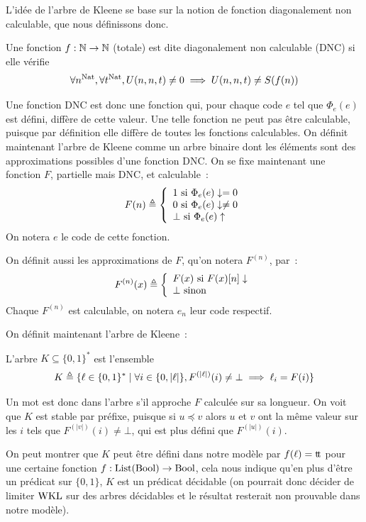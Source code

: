 \documentclass{article}
\begin{document}
L'idée de l'arbre de Kleene se base sur la notion de fonction diagonalement non calculable, que nous définissons donc.

\begin{defi}
    Une fonction $f : \mathbb{N} \to \mathbb{N}$ (totale) est dite diagonalement non calculable (DNC) si elle vérifie
    \[\forall n^{\mathrm{Nat}}, \forall t^{\mathrm{Nat}}, U(n,n,t) \neq 0 \implies U(n,n,t) \neq S(f(n))\]
\end{defi}

Une fonction DNC est donc une fonction qui, pour chaque code $e$ tel que $\Phi_e(e)$ est défini, diffère de cette valeur. Une telle fonction ne peut pas être calculable, puisque par définition elle diffère de toutes les fonctions calculables. On définit maintenant l'arbre de Kleene comme un arbre binaire dont les éléments sont des approximations possibles d'une fonction DNC. On se fixe maintenant une fonction $F$, partielle mais DNC, et calculable~:
\[F(n)\triangleq \left\{\begin{array}{l}
    1\text{ si } \Phi_e(e) \downarrow= 0\\
    0\text{ si } \Phi_e(e) \downarrow \neq 0\\
    \bot\text{ si } \Phi_e(e) \uparrow
\end{array}\right.\]
On notera $e$ le code de cette fonction.

On définit aussi les approximations de $F$, qu'on notera $F^{(n)}$, par~:
\[F^{(n)}(x) \triangleq \left\{\begin{array}{l}
    F(x) \text{ si } F(x)[n]\downarrow\\
    \bot\text{ sinon}
\end{array}\right.\]
Chaque $F^{(n)}$ est calculable, on notera $e_n$ leur code respectif.

On définit maintenant l'arbre de Kleene~:

\begin{defi}
    L'arbre $K\subseteq \{0,1\}^*$ est l'ensemble
    \[K \triangleq \{\ell \in \{0,1\}^* \mid \forall i \in \{0,|\ell|\}, F^{(|\ell|)}(i) \neq \bot \implies \ell_i = F(i)\}\]
\end{defi}

Un mot est donc dans l'arbre s'il approche $F$ calculée sur sa longueur. On voit que $K$ est stable par préfixe, puisque si $u\preceq v$ alors $u$ et $v$ ont la même valeur sur les $i$ tels que $F^{(|v|)}(i)\neq \bot$, qui est plus défini que $F^{(|u|)}(i)$.

On peut montrer que $K$ peut être défini dans notre modèle par $f(\ell) = \mathrm{t}\!\mathrm{t}$ pour une certaine fonction $f : \mathrm{List}(\mathrm{Bool}) \to \mathrm{Bool}$, cela nous indique qu'en plus d'être un prédicat sur $\{0,1\}$, $K$ est un prédicat décidable (on pourrait donc décider de limiter $\mathrm{WKL}$ sur des arbres décidables et le résultat resterait non prouvable dans notre modèle).
\end{document}

